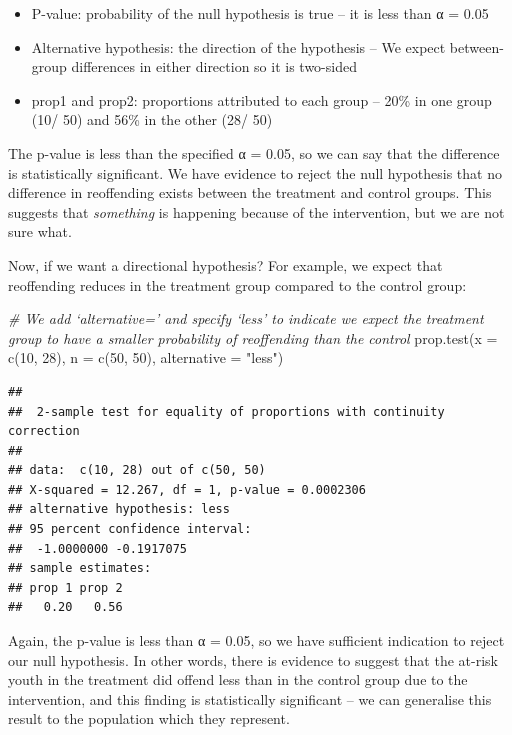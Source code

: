 \documentclass[
]{book}
\newenvironment{Shaded}{\begin{snugshade}}{\end{snugshade}}
\newcommand{\AttributeTok}[1]{\textcolor[rgb]{0.77,0.63,0.00}{#1}}
\newcommand{\CommentTok}[1]{\textcolor[rgb]{0.56,0.35,0.01}{\textit{#1}}}
\newcommand{\DecValTok}[1]{\textcolor[rgb]{0.00,0.00,0.81}{#1}}
\newcommand{\FunctionTok}[1]{\textcolor[rgb]{0.00,0.00,0.00}{#1}}
\newcommand{\NormalTok}[1]{#1}
\newcommand{\StringTok}[1]{\textcolor[rgb]{0.31,0.60,0.02}{#1}}
\begin{document}
\begin{itemize}
\item
  P-value: probability of the null hypothesis is true -- it is less than α = 0.05
\item
  Alternative hypothesis: the direction of the hypothesis -- We expect between-group differences in either direction so it is two-sided
\item
  prop1 and prop2: proportions attributed to each group -- 20\% in one group (10/ 50) and 56\% in the other (28/ 50)
\end{itemize}

The p-value is less than the specified α = 0.05, so we can say that the difference is statistically significant. We have evidence to reject the null hypothesis that no difference in reoffending exists between the treatment and control groups. This suggests that \emph{something} is happening because of the intervention, but we are not sure what.

Now, if we want a directional hypothesis? For example, we expect that reoffending reduces in the treatment group compared to the control group:

\begin{Shaded}
\begin{Highlighting}[]
\CommentTok{\# We add ‘alternative=’ and specify ‘less’ to indicate we expect the treatment group to have a smaller probability of reoffending than the control}
\FunctionTok{prop.test}\NormalTok{(}\AttributeTok{x =} \FunctionTok{c}\NormalTok{(}\DecValTok{10}\NormalTok{, }\DecValTok{28}\NormalTok{), }\AttributeTok{n =} \FunctionTok{c}\NormalTok{(}\DecValTok{50}\NormalTok{, }\DecValTok{50}\NormalTok{), }\AttributeTok{alternative =} \StringTok{"less"}\NormalTok{)}
\end{Highlighting}
\end{Shaded}

\begin{verbatim}
## 
##  2-sample test for equality of proportions with continuity correction
## 
## data:  c(10, 28) out of c(50, 50)
## X-squared = 12.267, df = 1, p-value = 0.0002306
## alternative hypothesis: less
## 95 percent confidence interval:
##  -1.0000000 -0.1917075
## sample estimates:
## prop 1 prop 2 
##   0.20   0.56
\end{verbatim}

Again, the p-value is less than α = 0.05, so we have sufficient indication to reject our null hypothesis. In other words, there is evidence to suggest that the at-risk youth in the treatment did offend less than in the control group due to the intervention, and this finding is statistically significant -- we can generalise this result to the population which they represent.
\end{document}
